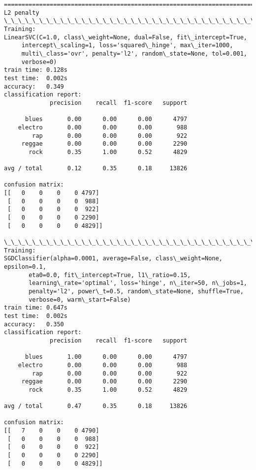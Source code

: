 \documentclass[11pt]{article}
\begin{document}
    \begin{Verbatim}[commandchars=\\\{\}]
================================================================================
L2 penalty
\_\_\_\_\_\_\_\_\_\_\_\_\_\_\_\_\_\_\_\_\_\_\_\_\_\_\_\_\_\_\_\_\_\_\_\_\_\_\_\_\_\_\_\_\_\_\_\_\_\_\_\_\_\_\_\_\_\_\_\_\_\_\_\_\_\_\_\_\_\_\_\_\_\_\_\_\_\_\_\_
Training: 
LinearSVC(C=1.0, class\_weight=None, dual=False, fit\_intercept=True,
     intercept\_scaling=1, loss='squared\_hinge', max\_iter=1000,
     multi\_class='ovr', penalty='l2', random\_state=None, tol=0.001,
     verbose=0)
train time: 0.128s
test time:  0.002s
accuracy:   0.349
classification report:
             precision    recall  f1-score   support

      blues       0.00      0.00      0.00      4797
    electro       0.00      0.00      0.00       988
        rap       0.00      0.00      0.00       922
     reggae       0.00      0.00      0.00      2290
       rock       0.35      1.00      0.52      4829

avg / total       0.12      0.35      0.18     13826

confusion matrix:
[[   0    0    0    0 4797]
 [   0    0    0    0  988]
 [   0    0    0    0  922]
 [   0    0    0    0 2290]
 [   0    0    0    0 4829]]

\_\_\_\_\_\_\_\_\_\_\_\_\_\_\_\_\_\_\_\_\_\_\_\_\_\_\_\_\_\_\_\_\_\_\_\_\_\_\_\_\_\_\_\_\_\_\_\_\_\_\_\_\_\_\_\_\_\_\_\_\_\_\_\_\_\_\_\_\_\_\_\_\_\_\_\_\_\_\_\_
Training: 
SGDClassifier(alpha=0.0001, average=False, class\_weight=None, epsilon=0.1,
       eta0=0.0, fit\_intercept=True, l1\_ratio=0.15,
       learning\_rate='optimal', loss='hinge', n\_iter=50, n\_jobs=1,
       penalty='l2', power\_t=0.5, random\_state=None, shuffle=True,
       verbose=0, warm\_start=False)
train time: 0.647s
test time:  0.002s
accuracy:   0.350
classification report:
             precision    recall  f1-score   support

      blues       1.00      0.00      0.00      4797
    electro       0.00      0.00      0.00       988
        rap       0.00      0.00      0.00       922
     reggae       0.00      0.00      0.00      2290
       rock       0.35      1.00      0.52      4829

avg / total       0.47      0.35      0.18     13826

confusion matrix:
[[   7    0    0    0 4790]
 [   0    0    0    0  988]
 [   0    0    0    0  922]
 [   0    0    0    0 2290]
 [   0    0    0    0 4829]]


\end{Verbatim}
\end{document}
